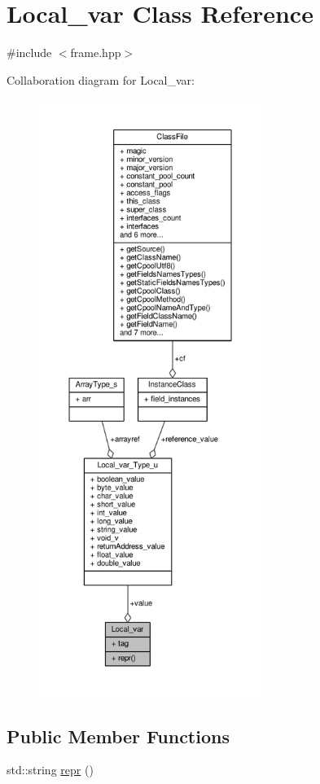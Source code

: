 \hypertarget{classLocal__var}{\section{Local\+\_\+var Class Reference}
\label{classLocal__var}
}


{\ttfamily \#include $<$frame.\+hpp$>$}



Collaboration diagram for Local\+\_\+var\+:
\nopagebreak
\begin{figure}[H]
\begin{center}
\leavevmode
\includegraphics[height=550pt]{classLocal__var__coll__graph}
\end{center}
\end{figure}
\subsection*{Public Member Functions}
\begin{DoxyCompactItemize}
\item 
std\+::string \hyperlink{classLocal__var_a3d330796f737fbd7a929eaaf9413dfc7}{repr} ()
\end{DoxyCompactItemize}
